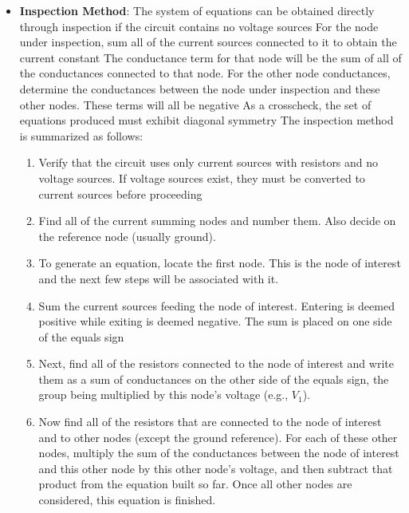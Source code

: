 \documentclass{report}
\begin{document}
\begin{itemize}
\begin{align*}
                \text{Node a: } I_{1} &= \left(\frac{1}{R_{1}} + \frac{1}{R_{3}}\right)V_{a} - \left(\frac{1}{R_{3}}\right)v_{b} \\
                \text{Node b: } -I_{2} &= -\left(\frac{1}{R_{3}}\right)V_{a} + \left(\frac{1}{R_{3}} + \frac{1}{R_{2}}\right)V_{b}
            .\end{align*}
            As the resistor values and currents are known, simultaneous equation solution techniques may be used to solve for the node voltages. Once again, there will be as many equations as node voltages
        \item \textbf{Inspection Method}: The system of equations can be obtained directly through inspection if the circuit contains no voltage sources
            \bigbreak \noindent 
             For the node under inspection, sum all of the current sources connected to it to obtain the current constant The conductance term for that node will be the sum of all of the conductances connected to that node. For the other node conductances, determine the conductances between the node under inspection and these other nodes. These terms will all be negative As a crosscheck, the set of equations produced must exhibit diagonal symmetry
             \bigbreak \noindent 
             The inspection method is summarized as follows:
             \begin{enumerate}
                 \item Verify that the circuit uses only current sources with resistors and no voltage sources. If voltage sources exist, they must be converted to current sources before proceeding
                 \item Find all of the current summing nodes and number them. Also decide on the reference node (usually ground).
                 \item To generate an equation, locate the first node. This is the node of interest and the next few steps will be associated with it.
                 \item Sum the current sources feeding the node of interest. Entering is deemed positive while exiting is deemed negative. The sum is placed on one side of the equals sign
                 \item Next, find all of the resistors connected to the node of interest and write them as a sum of conductances on the other side of the equals sign, the group being multiplied by this node's voltage (e.g., $V_{1}$).
                 \item Now find all of the resistors that are connected to the node of interest and to other nodes (except the ground reference). For each of these other nodes, multiply the sum of the conductances between the node of interest and this other node by this other node's voltage, and then subtract that product from the equation built so far. Once all other nodes are considered, this equation is finished.

\end{enumerate}
\end{itemize}
\end{document}
